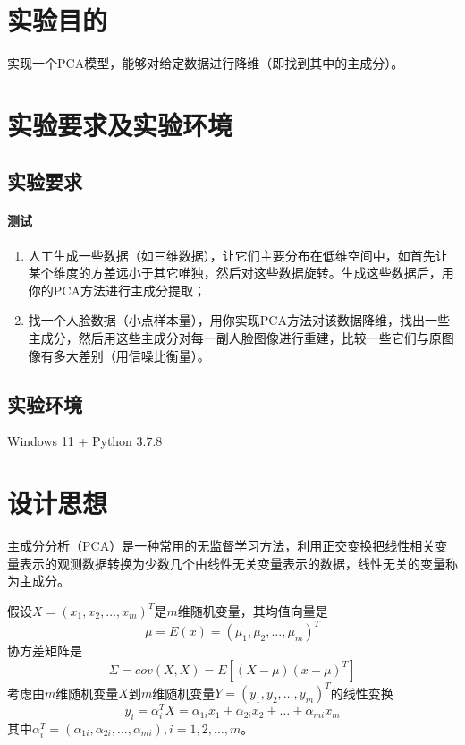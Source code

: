 \documentclass[lang=cn,11pt,a4paper,cite=authoryear]{elegantpaper}
\begin{document}
 
\newpage

\section{实验目的}

实现一个PCA模型，能够对给定数据进行降维（即找到其中的主成分）。

\section{实验要求及实验环境}

\subsection{实验要求}

\paragraph{测试}


\begin{enumerate}
	\item 人工生成一些数据（如三维数据），让它们主要分布在低维空间中，如首先让某个维度的方差远小于其它唯独，然后对这些数据旋转。生成这些数据后，用你的PCA方法进行主成分提取；
	\item 找一个人脸数据（小点样本量），用你实现PCA方法对该数据降维，找出一些主成分，然后用这些主成分对每一副人脸图像进行重建，比较一些它们与原图像有多大差别（用信噪比衡量）。
\end{enumerate}

\subsection{实验环境}

Windows 11 + Python 3.7.8

\section{设计思想}

主成分分析（PCA）是一种常用的无监督学习方法，利用正交变换把线性相关变量表示的观测数据转换为少数几个由线性无关变量表示的数据，线性无关的变量称为主成分。

假设$X=(x_1,x_2,\dots,x_m)^T$是$m$维随机变量，其均值向量是
\begin{equation}
\mu=E(x)=(\mu_1,\mu_2,\dots,\mu_m)^T
\end{equation}
协方差矩阵是
\begin{equation}
\Sigma=cov(X,X)=E[(X-\mu)(x-\mu)^T]
\end{equation}
考虑由$m$维随机变量$X$到$m$维随机变量$Y=(y_1,y_2,\dots,y_m)^T$的线性变换
\begin{equation}
y_i=\alpha_i^TX=\alpha_{1i}x_1+\alpha_{2i}x_2+\dots+\alpha_{mi}x_m
\label{eq:1}
\end{equation}
其中$\alpha_i^T=(\alpha_{1i},\alpha_{2i},\dots,\alpha_{mi}),i=1,2,\dots,m$。
\end{document}
